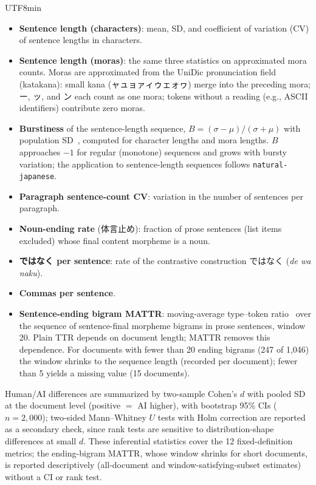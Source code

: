 \documentclass[11pt,a4paper]{article}
\begin{document}
\begin{CJK}{UTF8}{min}
\begin{itemize}
    \item \textbf{Sentence length (characters)}: mean, SD, and coefficient of variation (CV) of sentence lengths in characters.
    \item \sloppy \textbf{Sentence length (moras)}: the same three statistics on approximated mora counts. Moras are approximated from the UniDic pronunciation field (katakana): small kana (ャュョァィゥェォヮ) merge into the preceding mora; ー, ッ, and ン each count as one mora; tokens without a reading (e.g., ASCII identifiers) contribute zero moras.
    \item \textbf{Burstiness} of the sentence-length sequence, $B = (\sigma - \mu)/(\sigma + \mu)$ with population SD~\citep{goh2008burstiness}, computed for character lengths and mora lengths. $B$ approaches $-1$ for regular (monotone) sequences and grows with bursty variation; the application to sentence-length sequences follows \texttt{natural-japanese}.
    \item \textbf{Paragraph sentence-count CV}: variation in the number of sentences per paragraph.
    \item \textbf{Noun-ending rate} (体言止め): fraction of prose sentences (list items excluded) whose final content morpheme is a noun.
    \item \textbf{ではなく per sentence}: rate of the contrastive construction ではなく (\textit{de wa naku}).
    \item \textbf{Commas per sentence}.
    \item \textbf{Sentence-ending bigram MATTR}: moving-average type--token ratio~\citep{covington2010mattr} over the sequence of sentence-final morpheme bigrams in prose sentences, window 20. Plain TTR depends on document length; MATTR removes this dependence. For documents with fewer than 20 ending bigrams (247 of 1{,}046) the window shrinks to the sequence length (recorded per document); fewer than 5 yields a missing value (15 documents).
\end{itemize}

Human/AI differences are summarized by two-sample Cohen's $d$ with pooled SD at the document level (positive $=$ AI higher), with bootstrap 95\% CIs ($n=2{,}000$); two-sided Mann--Whitney $U$ tests with Holm correction are reported as a secondary check, since rank tests are sensitive to distribution-shape differences at small $d$. These inferential statistics cover the 12 fixed-definition metrics; the ending-bigram MATTR, whose window shrinks for short documents, is reported descriptively (all-document and window-satisfying-subset estimates) without a CI or rank test.


\end{CJK}
\end{document}
